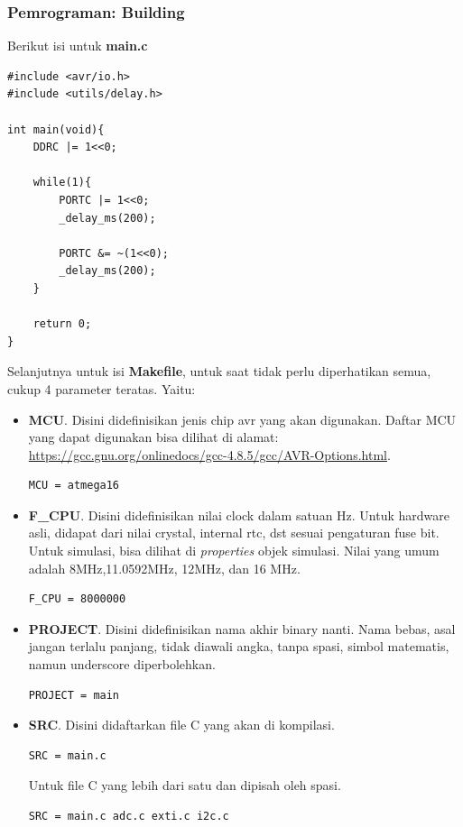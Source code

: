 \documentclass[12pt,]{article}
\begin{document}
	\newpage
	\subsubsection{Pemrograman: Building}
	
	Berikut isi untuk \textbf{main.c}
	\begin{verbatim}
#include <avr/io.h>
#include <utils/delay.h>

int main(void){
	DDRC |= 1<<0;
	
	while(1){
		PORTC |= 1<<0;
		_delay_ms(200);
		
		PORTC &= ~(1<<0);
		_delay_ms(200);
	}
	
	return 0;
}
	\end{verbatim}
	
	Selanjutnya untuk isi \textbf{Makefile}, untuk saat tidak perlu diperhatikan semua, cukup 4 parameter teratas.
	Yaitu:
	\begin{itemize}
		\item \textbf{MCU}. Disini didefinisikan jenis chip avr yang akan digunakan.
		Daftar MCU yang dapat digunakan bisa dilihat di alamat:\\
		\url{https://gcc.gnu.org/onlinedocs/gcc-4.8.5/gcc/AVR-Options.html}.
		
		\begin{verbatim}
MCU = atmega16
		\end{verbatim}
		
		\item \textbf{F\_CPU}. Disini didefinisikan nilai clock dalam satuan Hz.
		Untuk hardware asli, didapat dari nilai crystal, internal rtc, dst sesuai pengaturan fuse bit.
		Untuk simulasi, bisa dilihat di \textit{properties} objek simulasi.
		Nilai yang umum adalah 8MHz,11.0592MHz, 12MHz, dan 16 MHz.
		\begin{verbatim}
F_CPU = 8000000
		\end{verbatim}
		
		\item \textbf{PROJECT}. Disini didefinisikan nama akhir binary nanti.
		Nama bebas, asal jangan terlalu panjang, tidak diawali angka, tanpa spasi, simbol matematis, namun underscore diperbolehkan.
		\begin{verbatim}
PROJECT = main
		\end{verbatim}
		
		\item \textbf{SRC}. Disini didaftarkan file C yang akan di kompilasi.
		
		\begin{verbatim}
SRC = main.c
		\end{verbatim}
		
		Untuk file C yang lebih dari satu dan dipisah oleh spasi.
		
		\begin{verbatim}
SRC = main.c adc.c exti.c i2c.c
		\end{verbatim}
	\end{itemize}
\end{document}
